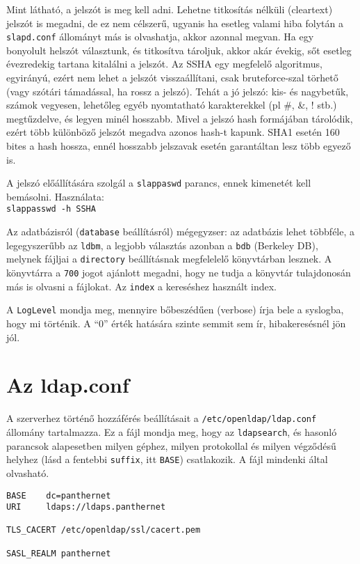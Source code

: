 Mint látható, a jelszót is meg kell adni. Lehetne titkosítás nélküli (cleartext) jelszót is megadni, de ez nem
célszerű, ugyanis ha esetleg valami hiba folytán a \texttt{slapd.conf} állományt más is olvashatja, akkor azonnal
megvan. Ha egy bonyolult helszót választunk, és titkosítva tároljuk, akkor akár évekig, sőt esetleg évezredekig
tartana kitalálni a jelszót. Az SSHA egy megfelelő algoritmus, egyirányú, ezért
nem lehet a jelszót visszaállítani, csak bruteforce-szal törhető (vagy szótári támadással, ha rossz a jelszó). Tehát a
jó jelszó: kis-  és nagybetűk, számok vegyesen, lehetőleg egyéb nyomtatható karakterekkel (pl \#, \&, ! stb.)
megtűzdelve, és legyen minél hosszabb. Mivel a jelszó hash formájában tárolódik, ezért több különböző jelszót megadva
azonos hash-t kapunk. SHA1 esetén 160 bites a hash hossza, ennél hosszabb jelszavak esetén garantáltan lesz több
egyező is.


A jelszó előállítására szolgál a \texttt{slappaswd} parancs, ennek kimenetét kell bemásolni. Használata:\\
\texttt{slappasswd -h {SSHA}}


Az adatbázisról (\texttt{database} beállításról) mégegyzser: az adatbázis lehet többféle, a legegyszerűbb az
\texttt{ldbm}, a legjobb választás azonban a  \texttt{bdb} (Berkeley DB), melynek fájljai a \texttt{directory}
beállításnak megfelelelő könyvtárban lesznek. A könyvtárra a \texttt{700} jogot ajánlott megadni, hogy ne tudja a
könyvtár tulajdonosán más is olvasni a fájlokat. Az  \texttt{index} a  kereséshez használt index.

A \texttt{LogLevel} mondja meg, mennyire bőbeszédűen (verbose) írja bele a syslogba, hogy mi történik. A ``0'' érték
hatására szinte semmit sem ír, hibakeresésnél jön jól.

\section{Az ldap.conf}
A szerverhez történő hozzáférés beállításait a \texttt{/etc/openldap/ldap.conf} állomány tartalmazza.
Ez a fájl mondja meg, hogy az \texttt{ldapsearch}, és hasonló parancsok alapesetben milyen géphez, milyen protokollal
és milyen végződésű helyhez (lásd a fentebbi \texttt{suffix}, itt \texttt{BASE}) csatlakozik. A fájl mindenki által
olvasható.

\begin{Verbatim}[frame=single,label=ldap.conf]
BASE    dc=panthernet
URI     ldaps://ldaps.panthernet

TLS_CACERT /etc/openldap/ssl/cacert.pem

SASL_REALM panthernet
\end{Verbatim}


